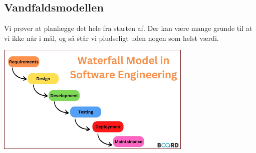 \subsection{Vandfaldsmodellen}
Vi prøver at planlægge det hele fra starten af. Der kan være mange
grunde til at vi ikke når i mål, og så står vi pludseligt uden
nogen som helst værdi.

\begin{center}
	\includegraphics[width=0.7\textwidth]{Images/vandfald.png}
\end{center}
